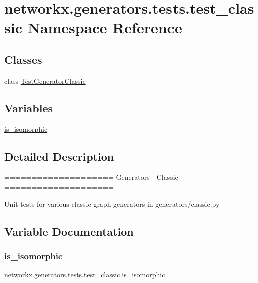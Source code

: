 \hypertarget{namespacenetworkx_1_1generators_1_1tests_1_1test__classic}{}\section{networkx.\+generators.\+tests.\+test\+\_\+classic Namespace Reference}
\label{namespacenetworkx_1_1generators_1_1tests_1_1test__classic}
\subsection*{Classes}
\begin{DoxyCompactItemize}
\item 
class \hyperlink{classnetworkx_1_1generators_1_1tests_1_1test__classic_1_1TestGeneratorClassic}{Test\+Generator\+Classic}
\end{DoxyCompactItemize}
\subsection*{Variables}
\begin{DoxyCompactItemize}
\item 
\hyperlink{namespacenetworkx_1_1generators_1_1tests_1_1test__classic_a4eb84f66008d0f0343526be95c751d29}{is\+\_\+isomorphic}
\end{DoxyCompactItemize}


\subsection{Detailed Description}
\begin{DoxyVerb}====================
Generators - Classic
====================

Unit tests for various classic graph generators in generators/classic.py
\end{DoxyVerb}
 

\subsection{Variable Documentation}
\mbox{\label{namespacenetworkx_1_1generators_1_1tests_1_1test__classic_a4eb84f66008d0f0343526be95c751d29}} 
\subsubsection{\texorpdfstring{is\+\_\+isomorphic}{is\_isomorphic}}
{\footnotesize\ttfamily networkx.\+generators.\+tests.\+test\+\_\+classic.\+is\+\_\+isomorphic}

